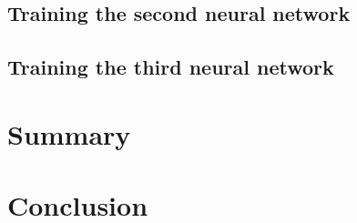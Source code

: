 \subsection{Training the second neural network}
\subsection{Training the third neural network}
\section{Summary}

\section{Conclusion\label{sec:conclusions}}

